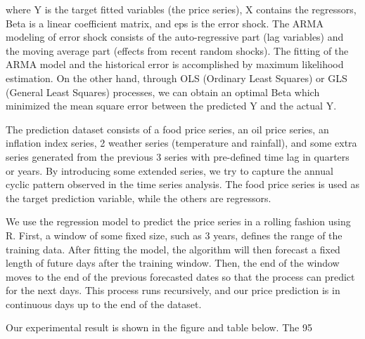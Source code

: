 where Y is the target fitted variables (the price series), X contains the regressors, Beta is a linear coefficient matrix, and eps is the error shock. The ARMA modeling of error shock consists of the auto-regressive part (lag variables) and the moving average part (effects from recent random shocks). The fitting of the ARMA model and the historical error is accomplished by maximum likelihood estimation. On the other hand, through OLS (Ordinary Least Squares) or GLS (General Least Squares) processes, we can obtain an optimal Beta which minimized the mean square error between the predicted Y and the actual Y.

The prediction dataset consists of a food price series, an oil price series, an inflation index series, 2 weather series (temperature and rainfall), and some extra series generated from the previous 3 series with pre-defined time lag in quarters or years. By introducing some extended series, we try to capture the annual cyclic pattern observed in the time series analysis. The food price series is used as the target prediction variable, while the others are regressors.

We use the regression model to predict the price series in a rolling fashion using R. First, a window of some fixed size, such as 3 years, defines the range of the training data. After fitting the model, the algorithm will then forecast a fixed length of future days after the training window. Then, the end of the window moves to the end of the previous forecasted dates so that the process can predict for the next days. This process runs recursively, and our price prediction is in continuous days up to the end of the dataset.

Our experimental result is shown in the figure and table below. The 95%

